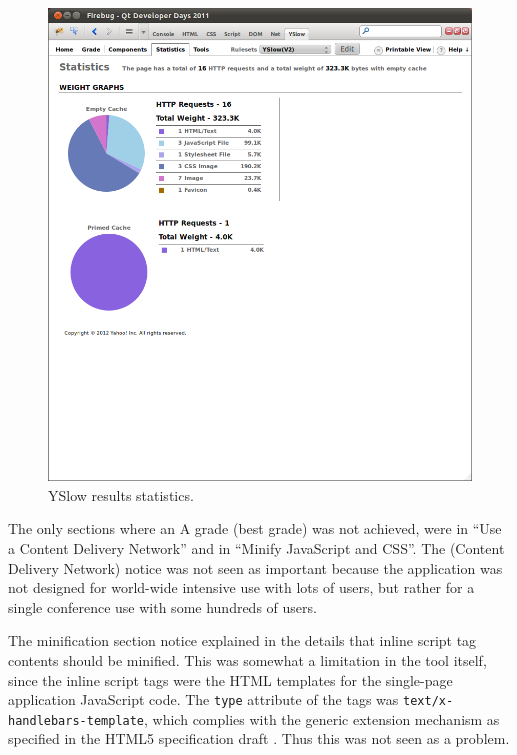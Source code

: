 \begin{figure}[h!]
  \begin{center}
    \includegraphics[width=\textwidth]{images/yslow-v2-statistics.png}
    \caption{YSlow results statistics.}
    \label{figure:yslow-v2-statistics.png}
  \end{center}
\end{figure}

The only sections where an A grade (best grade) was not achieved, were
in ``Use a Content Delivery Network'' and in ``Minify JavaScript and
CSS''. The  (Content Delivery Network) notice was not seen
as important because the application was not designed for world-wide
intensive use with lots of users, but rather for a single conference
use with some hundreds of users.

The minification section notice explained in the details that inline
script tag contents should be minified. This was somewhat a limitation
in the tool itself, since the inline script tags were the HTML
templates for the single-page application JavaScript code. The
\texttt{type} attribute of the tags was
\texttt{text/x-handlebars-template}, which complies with the generic
extension mechanism as specified in the HTML5 specification draft
\cite{HTML5draft}. Thus this was not seen as a problem.

